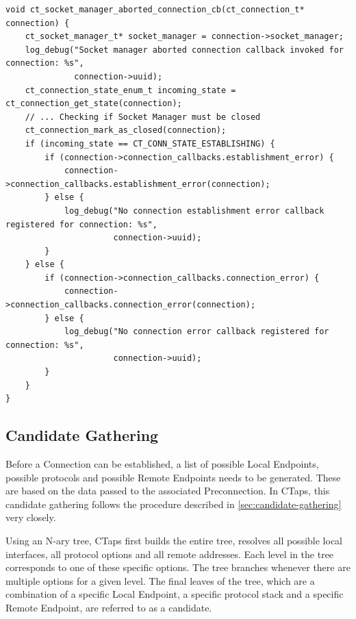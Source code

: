 \begin{listing}[htbp]
  \begin{verbatim}
void ct_socket_manager_aborted_connection_cb(ct_connection_t* connection) {
    ct_socket_manager_t* socket_manager = connection->socket_manager;
    log_debug("Socket manager aborted connection callback invoked for connection: %s",
              connection->uuid);
    ct_connection_state_enum_t incoming_state = ct_connection_get_state(connection);
    // ... Checking if Socket Manager must be closed
    ct_connection_mark_as_closed(connection);
    if (incoming_state == CT_CONN_STATE_ESTABLISHING) {
        if (connection->connection_callbacks.establishment_error) {
            connection->connection_callbacks.establishment_error(connection);
        } else {
            log_debug("No connection establishment error callback registered for connection: %s",
                      connection->uuid);
        }
    } else {
        if (connection->connection_callbacks.connection_error) {
            connection->connection_callbacks.connection_error(connection);
        } else {
            log_debug("No connection error callback registered for connection: %s",
                      connection->uuid);
        }
    }
}
  \end{verbatim}
  \caption[Connection aborted callback in Socket Manager]
  {
    Excerpt from Socket Manager callback invoked by a protocol interface on Connection abort. 
    Which callback is invoked is based on the previous state of the
    aborted Connection.
  }
  \label{lst:aborted-conn-cb}
\end{listing}

\subsection{Candidate Gathering} \label{sec:candidateGathering}
Before a Connection can be established, a list of possible Local Endpoints,
possible protocols and possible Remote Endpoints
needs to be generated. These are based on the data passed to the associated Preconnection.
In CTaps, this candidate gathering follows the procedure described in \cref{sec:candidate-gathering}
very closely.

Using an N-ary tree,
CTaps first builds the entire tree, resolves
all possible local interfaces, all protocol options and all remote addresses.
Each level in the tree corresponds to one of these specific
options. The tree branches whenever there are multiple options for a given level.
The final leaves of the tree, which are a combination of a specific Local Endpoint, a specific protocol
stack and a specific Remote Endpoint, are referred to as a candidate.

